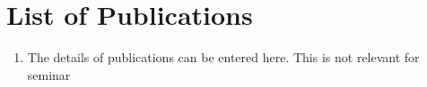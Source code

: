 
\section*{List of Publications}
\begin{enumerate}
\item The details of publications can be entered here. This is not relevant for seminar
\end{enumerate}